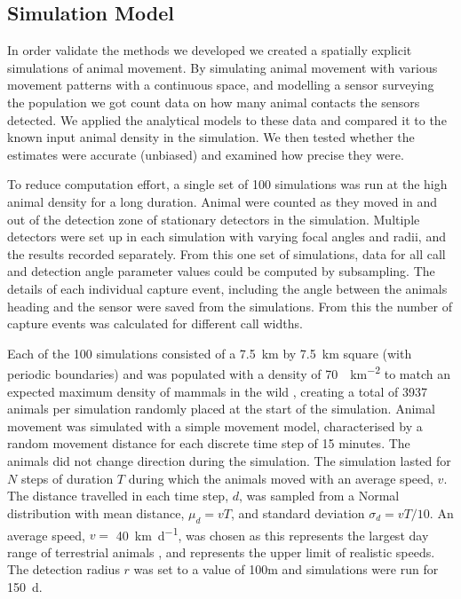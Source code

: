 \documentclass[a4paper,10pt,reqno,oneside]{amsart}
\begin{document}
\subsection{Simulation Model}

In order validate the methods we developed we created a spatially explicit simulations of animal movement. By simulating animal movement with various movement patterns with a continuous space, and modelling a sensor surveying the population we got count data on how many animal contacts the sensors detected. We applied the analytical models to these data and compared it to the known input animal density in the simulation. We then tested whether the estimates were accurate (unbiased) and examined how precise they were.

To reduce computation effort, a single set of 100 simulations was run at the high animal density for a long duration. Animal were counted as they moved in and out of the detection zone of stationary detectors in the simulation. Multiple detectors were set up in each simulation with varying focal angles and radii, and the results recorded separately. From this one set of simulations, data for all call and detection angle parameter values could be computed by subsampling. The details of each individual capture event, including the angle between the animals heading and the sensor were saved from the simulations.  From this the number of capture events was calculated for different call widths.

Each of the 100 simulations consisted of a  \SI{7.5}{\kilo\meter} by \SI{7.5}{\kilo\meter} square (with periodic boundaries) and was populated with a density of \SI{70}{\animals\per\kilo\meter\squared} to match an expected maximum density of mammals in the wild \citep{damuth1981population}, creating a total of 3937 animals per simulation randomly placed at the start of the simulation. Animal movement was simulated with a simple movement model, characterised by a random movement distance for each discrete time step of 15 minutes. The animals did not change direction during the simulation. The simulation lasted for $N$ steps of duration $T$ during which the animals moved with an average speed, $v$. The distance travelled in each time step, $d$, was sampled from a Normal distribution with mean distance, $\mu_d = vT$,  and standard deviation $\sigma_d = vT/10$. An average speed, $v = $ \SI{40}{\kilo\meter \per \day}, was chosen as this represents the largest day range of terrestrial animals \citep{carbone2005far}, and represents the upper limit of realistic speeds. The detection radius $r$ was set to a value of 100m and simulations were run for \SI{150}{\day}.
\end{document}
